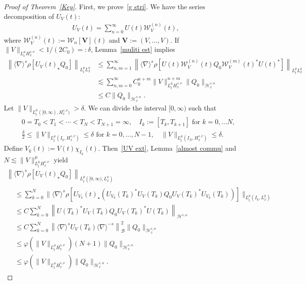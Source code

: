 \documentclass[10pt,a4paper]{amsart}
\newcommand{\vV}{{\mathbf{V}}}
\newcommand{\CB}{\mathcal{B}}
\newcommand{\CH}{\mathcal{H}}
\newcommand{\CW}{\mathcal{W}}
\newcommand{\al}{\alpha}
\newcommand{\de}{\delta}
\newcommand{\ph}{\varphi}
\newcommand{\rh}{\rho}
\newcommand{\ch}{\chi}
\newcommand{\I}{\infty}
\newcommand{\sd}{\langle \nabla \rangle}
\newcommand{\st}{\star}
\newcommand{\ls}{\lesssim}
\begin{document}
\begin{proof}[{Proof of Theorem~\ref{Key}}]
First, we prove~\eqref{g stri}. We have the series decomposition of $U_V(t)$:
\begin{align}\label{UVWV}
U_V(t) = \sum_{n=0}^\I U(t)\CW_V^{(n)}(t),
\end{align}
where $\CW_V^{(n)}(t) := \CW_n[\vV](t)$ and $\vV:=(V,\dots, V)$. If $\|V\|_{L^\mu_t H^{s,\nu}_x} < 1/(2C_0)=:\de$, Lemma~\ref{muliti est} implies
\begin{equation}
\begin{split}
\left\|\sd^s \rh[U_V(t)_\st Q_0]\right\|_{L^p_t L^q_x} &\le \sum_{n,m=1}^\I \left\|\sd^s \rh\left[U(t)\CW_V^{(n)}(t) Q_0 \CW_V^{(m)}(t)^* U(t)^*\right]\right\|_{L^p_t L^q_x} \\
&\ls \sum_{n,m=0}^\I C_0^{n+m}
\|V\|_{L^\mu_t H^{s,\nu}_x}^{n+m}
\|Q_0\|_{\CH^{s,\al}_x} \\
&\le C
\|Q_0\|_{\CH^{s,\al}_x}.
\end{split}
\end{equation}
Let $\|V\|_{L^\mu_t([0,\I), H^{s,\nu}_x)} >\de$. We can divide the interval $[0,\I)$ such that
\begin{align}
&0=T_0 < T_1 < \cdots < T_N < T_{N+1}=\I, \quad I_k := [T_k,T_{k+1}] \text{ for } k=0, \dots N,\\
&\frac{\de}{2} \le \|V\|_{L^\mu_t(I_k,H^{s,\nu}_x)} \le \de \text{ for } k=0,\dots,N-1,
\quad \|V\|_{L^\mu_t(I_N,H^{s,\nu}_x)} \le \de.
\end{align}
Define $V_k(t) := V(t) \ch_{I_k}(t)$. Then~\eqref{UV ext}, Lemma~\ref{almost commu} and $N \lesssim \|V\|_{L^\mu_t H^{s,\nu}_x}^\mu$ yield
\begin{multline}
\left\|\sd^s \rh[U_V(t)_\st Q_0]\right\|_{L^p_t\left([0,\I),L^q_x\right)} \\
\begin{aligned}
&\le \sum_{k=0}^N
\big\|\sd^s \rh\left[U_{V_k}(t)_\st \left(U_{V_k}(T_k)^*U_V(T_k)Q_0U_V(T_k)^*U_{V_k}(T_k)\right)\right]\big\|_{L^p_t\left(I_k,L^q_x\right)} \\
&\le C \sum_{k=0}^N \left\|U(T_k)^*U_V(T_k)Q_0U_V(T_k)^*U(T_k)\right\|_{\CH^{s,\al}} \\
&\le C \sum_{k=0}^N \left\|\sd^s U_V(T_k) \sd^{-s}\right\|_{\CB}^2
\|Q_0\|_{\CH^{s,\al}_x} \\
&\le \ph\left(\|V\|_{L^\mu_t H^{s,\nu}_x}\right) (N+1) \|Q_0\|_{\CH^{s,\al}_x} \\
&\le \ph\left(\|V\|_{L^\mu_t H^{s,\nu}_x}\right) \|Q_0\|_{\CH^{s,\al}_x}.
\end{aligned}
\end{multline}


\end{proof}
\end{document}
